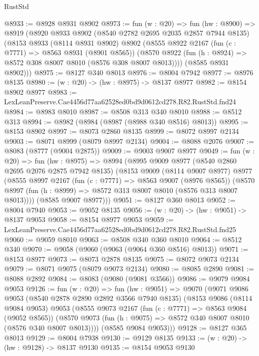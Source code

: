 \begin{lexlean}{RustStd}
\begin{coremodule}
@8933 := @8928 @8931 @8902
@8973 := fun (w : @20) =>
  fun (hw : @8900) =>
  @8919
    (@8920
      @8933
      @8902
      (@8540 @2782 @2695 @2035 @2857 @7944 @8135)
      (@8153
        @8933
        (@8114 @8931 @8902)
        @8902
        (@8555
          @8922
          @2167
          (fun (c : @7771) => @8563 @8931 (@8901 @8565))
          (@8570 @8922 (fun (h : @8924) => @8572 @308 @8007 @8010 (@8576 @308 @8007 @8013))))
        (@8585 @8931 @8902)))
@8975 := @8127 @340 @8013
@8976 := @8004 @7942
@8977 := @8976 @8135
@8980 := (w : @20) -> (hw : @8975) -> @8137 @8977
@8982 := @8154 @8902 @8977
@8983 := LexLeanPreserve.Cae4456d77aa62528ed0bd9d0612cd278.R82.RustStd.fnd24
@8984 := @8983 @8010
@8987 := @8508 @313 @340 @8010
@8988 := @8512 @313
@8994 := @8982 (@8984 (@8987 (@8988 @340 @8516) @8013))
@8995 := @8153 @8902
@8997 := @8073 @2860 @8135
@8999 := @8072 @8997 @2134
@9003 := @8071 @8999 (@8079 @8997 @2134)
@9004 := @8088 @2076
@9007 := @8083 (@8777 (@9004 @2875))
@9009 := @9003 @9007 @8977
@9049 := fun (w : @20) =>
  fun (hw : @8975) =>
  @8994
    (@8995
      @9009
      @8977
      (@8540 @2860 @2695 @2076 @2875 @7942 @8135)
      (@8153
        @9009
        (@8114 @9007 @8977)
        @8977
        (@8555
          @8997
          @2167
          (fun (c : @7771) => @8563 @9007 (@8976 @8565))
          (@8570 @8997 (fun (h : @8999) => @8572 @313 @8007 @8010 (@8576 @313 @8007 @8013))))
        (@8585 @9007 @8977)))
@9051 := @8127 @360 @8013
@9052 := @8004 @7940
@9053 := @9052 @8135
@9056 := (w : @20) -> (hw : @9051) -> @8137 @9053
@9058 := @8154 @8977 @9053
@9059 := LexLeanPreserve.Cae4456d77aa62528ed0bd9d0612cd278.R82.RustStd.fnd25
@9060 := @9059 @8010
@9063 := @8508 @340 @360 @8010
@9064 := @8512 @340
@9070 := @9058 (@9060 (@9063 (@9064 @360 @8516) @8013))
@9071 := @8153 @8977
@9073 := @8073 @2878 @8135
@9075 := @8072 @9073 @2134
@9079 := @8071 @9075 (@8079 @9073 @2134)
@9080 := @8085 @2890
@9081 := @8088 @2892
@9084 := @8083 (@9080 (@9081 @3566))
@9086 := @9079 @9084 @9053
@9126 := fun (w : @20) =>
  fun (hw : @9051) =>
  @9070
    (@9071
      @9086
      @9053
      (@8540 @2878 @2890 @2892 @3566 @7940 @8135)
      (@8153
        @9086
        (@8114 @9084 @9053)
        @9053
        (@8555
          @9073
          @2167
          (fun (c : @7771) => @8563 @9084 (@9052 @8565))
          (@8570 @9073 (fun (h : @9075) => @8572 @340 @8007 @8010 (@8576 @340 @8007 @8013))))
        (@8585 @9084 @9053)))
@9128 := @8127 @365 @8013
@9129 := @8004 @7938
@9130 := @9129 @8135
@9133 := (w : @20) -> (hw : @9128) -> @8137 @9130
@9135 := @8154 @9053 @9130

\end{coremodule}
\end{lexlean}
